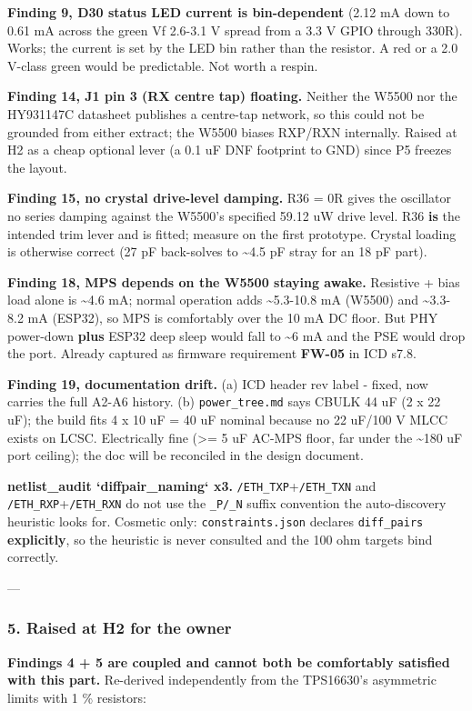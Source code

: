 \documentclass[11pt,a4paper]{article}
\begin{document}
\textbf{Finding 9, D30 status LED current is bin-dependent} (2.12 mA down to 0.61 mA across the green Vf 2.6-3.1 V spread from a 3.3 V GPIO through 330R). Works; the current is set by the LED bin rather than the resistor. A red or a 2.0 V-class green would be predictable. Not worth a respin.

\textbf{Finding 14, J1 pin 3 (RX centre tap) floating.} Neither the W5500 nor the HY931147C datasheet publishes a centre-tap network, so this could not be grounded from either extract; the W5500 biases RXP/RXN internally. Raised at H2 as a cheap optional lever (a 0.1 uF DNF footprint to GND) since P5 freezes the layout.

\textbf{Finding 15, no crystal drive-level damping.} R36 = 0R gives the oscillator no series damping against the W5500's specified 59.12 uW drive level. R36 \textbf{is} the intended trim lever and is fitted; measure on the first prototype. Crystal loading is otherwise correct (27 pF back-solves to \textasciitilde{}4.5 pF stray for an 18 pF part).

\textbf{Finding 18, MPS depends on the W5500 staying awake.} Resistive + bias load alone is \textasciitilde{}4.6 mA; normal operation adds \textasciitilde{}5.3-10.8 mA (W5500) and \textasciitilde{}3.3-8.2 mA (ESP32), so MPS is comfortably over the 10 mA DC floor. But PHY power-down \textbf{plus} ESP32 deep sleep would fall to \textasciitilde{}6 mA and the PSE would drop the port. Already captured as firmware requirement \textbf{FW-05} in ICD s7.8.

\textbf{Finding 19, documentation drift.} (a) ICD header rev label - fixed, now carries the full A2-A6 history. (b) \texttt{power\_tree.md} says CBULK 44 uF (2 x 22 uF); the build fits 4 x 10 uF = 40 uF nominal because no 22 uF/100 V MLCC exists on LCSC. Electrically fine (\textgreater{}= 5 uF AC-MPS floor, far under the \textasciitilde{}180 uF port ceiling); the doc will be reconciled in the design document.

\textbf{netlist\_audit `diffpair\_naming` x3.} \texttt{/ETH\_TXP}+\texttt{/ETH\_TXN} and \texttt{/ETH\_RXP}+\texttt{/ETH\_RXN} do not use the \texttt{\_P/\_N} suffix convention the auto-discovery heuristic looks for. Cosmetic only: \texttt{constraints.json} declares \texttt{diff\_pairs} \textbf{explicitly}, so the heuristic is never consulted and the 100 ohm targets bind correctly.

---

\subsubsection*{5. Raised at H2 for the owner}
\textbf{Findings 4 + 5 are coupled and cannot both be comfortably satisfied with this part.} Re-derived independently from the TPS16630's asymmetric limits with 1 \% resistors:
\end{document}
